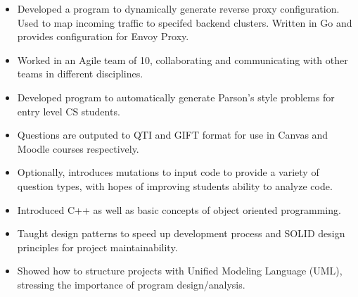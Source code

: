 

\begin{itemize}
    \item Developed a program to dynamically generate reverse proxy configuration.  Used to map incoming traffic to specifed 
      backend clusters.  Written in Go and provides configuration for Envoy Proxy.
    \item Worked in an Agile team of 10, collaborating and communicating with other teams in different disciplines.
\end{itemize}


\divider


\begin{itemize}
    \item Developed program to automatically generate Parson's style problems for entry level CS students.
    \item Questions are outputed to QTI and GIFT format for use in Canvas and Moodle courses respectively.
    \item Optionally, introduces mutations to input code to provide a variety of question types, with hopes of improving students 
      ability to analyze code.
\end{itemize}


\divider


\begin{itemize}
    \item Introduced C++ as well as basic concepts of object oriented programming.
    \item Taught design patterns to speed up development process and SOLID design principles for project maintainability.
    \item Showed how to structure projects with Unified Modeling Language (UML), stressing the importance of program design/analysis.
\end{itemize}


